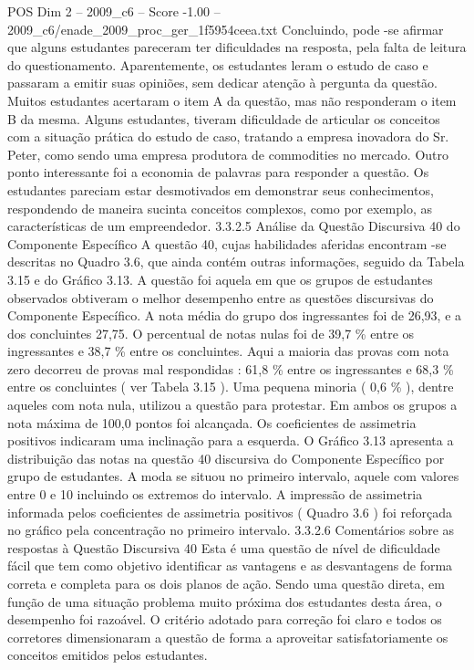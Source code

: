 \begin{textsample}{POS Dim 2 – 2009\_c6 – Score -1.00 – 2009\_c6/enade\_2009\_proc\_ger\_1f5954ceea.txt}
Concluindo, pode -se afirmar que alguns estudantes pareceram ter dificuldades na resposta, pela falta de leitura do questionamento.
Aparentemente, os estudantes leram o estudo de caso e passaram a emitir suas opiniões, sem dedicar atenção à pergunta da questão.
Muitos estudantes acertaram o item A da questão, mas não responderam o item B da mesma.
Alguns estudantes, tiveram dificuldade de articular os conceitos com a situação prática do estudo de caso, tratando a empresa inovadora do Sr.
Peter, como sendo uma empresa produtora de commodities no mercado.
Outro ponto interessante foi a economia de palavras para responder a questão.
Os estudantes pareciam estar desmotivados em demonstrar seus conhecimentos, respondendo de maneira sucinta conceitos complexos, como por exemplo, as características de um empreendedor. 3.3.2.5 Análise da Questão Discursiva 40 do Componente Específico A questão 40, cujas habilidades aferidas encontram -se descritas no Quadro 3.6, que ainda contém outras informações, seguido da Tabela 3.15 e do Gráfico 3.13.
A questão foi aquela em que os grupos de estudantes observados obtiveram o melhor desempenho entre as questões discursivas do Componente Específico.
A nota média do grupo dos ingressantes foi de 26,93, e a dos concluintes 27,75.
O percentual de notas nulas foi de 39,7 \% entre os ingressantes e 38,7 \% entre os concluintes.
Aqui a maioria das provas com nota zero decorreu de provas mal respondidas : 61,8 \% entre os ingressantes e 68,3 \% entre os concluintes ( ver Tabela 3.15 ).
Uma pequena minoria ( 0,6 \% ), dentre aqueles com nota nula, utilizou a questão para protestar.
Em ambos os grupos a nota máxima de 100,0 pontos foi alcançada.
Os coeficientes de assimetria positivos indicaram uma inclinação para a esquerda.
O Gráfico 3.13 apresenta a distribuição das notas na questão 40 discursiva do Componente Específico por grupo de estudantes.
A moda se situou no primeiro intervalo, aquele com valores entre 0 e 10 incluindo os extremos do intervalo.
A impressão de assimetria informada pelos coeficientes de assimetria positivos ( Quadro 3.6 ) foi reforçada no gráfico pela concentração no primeiro intervalo. 3.3.2.6 Comentários sobre as respostas à Questão Discursiva 40 Esta é uma questão de nível de dificuldade fácil que tem como objetivo identificar as vantagens e as desvantagens de forma correta e completa para os dois planos de ação.
Sendo uma questão direta, em função de uma situação problema muito próxima dos estudantes desta área, o desempenho foi razoável.
O critério adotado para correção foi claro e todos os corretores dimensionaram a questão de forma a aproveitar satisfatoriamente os conceitos emitidos pelos estudantes.

\end{textsample}
